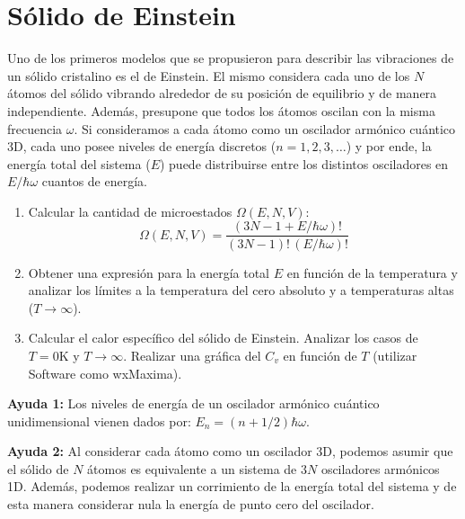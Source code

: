 \documentclass[a4paper,11pt]{article}
\begin{document}
\section{Sólido de Einstein}

Uno de los primeros modelos que se propusieron para describir las vibraciones
de un sólido cristalino es el de Einstein. El mismo considera cada uno de los
$N$ átomos del sólido vibrando alrededor de su posición de equilibrio y de
manera independiente. Además, presupone que todos los átomos oscilan con la
misma frecuencia $\omega$. Si consideramos a cada átomo como un oscilador
armónico cuántico 3D, cada uno posee niveles de energía discretos
($n = 1, 2, 3, \dots$) y por ende, la energía total del sistema ($E$) puede
distribuirse entre los distintos osciladores en $E/\hbar\omega$
cuantos de energía.

\begin{enumerate}[label=(\alph*),
                  leftmargin=2\parindent,
                  rightmargin=2\parindent]

    \item{Calcular la cantidad de microestados $\Omega(E, N, V)$:\\
          $$\Omega(E, N, V) =
          \frac{(3N - 1 + E/\hbar\omega)!}{(3N - 1)! \, (E/\hbar\omega)!}$$
          }

    \item{Obtener una expresión para la energía total $E$ en función
          de la temperatura y analizar los límites a la temperatura del
          cero absoluto y a temperaturas altas ($T \rightarrow \infty$).
          }

    \item{Calcular el calor específico del sólido de Einstein.
          Analizar los casos de $T=0 \text{K}$ y $T \rightarrow \infty$.
          Realizar una gráfica del $C_v$ en función de $T$
          (utilizar Software como wxMaxima).
          }
\end{enumerate}

{\small
\textbf{Ayuda 1:} Los niveles de energía de un oscilador armónico cuántico
unidimensional vienen dados por: $E_n = (n + 1/2) \hbar \omega$.

\textbf{Ayuda 2:} Al considerar cada átomo como un oscilador 3D, podemos asumir
que el sólido de $N$ átomos es equivalente a un sistema de $3N$ osciladores
armónicos 1D. Además, podemos realizar un corrimiento de la energía total
del sistema y de esta manera considerar nula la energía de punto cero del
oscilador.
}
\end{document}
